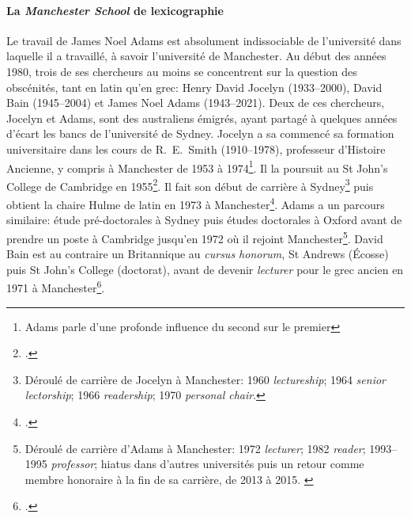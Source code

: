 \paragraph{La \textit{Manchester School} de lexicographie}

Le travail de James Noel Adams est absolument indissociable de l'université dans laquelle il a travaillé, à savoir l'université de Manchester. Au début des années 1980, trois de ses chercheurs au moins se concentrent sur la question des obscénités, tant en latin qu'en grec: Henry David Jocelyn (1933--2000), David Bain (1945--2004) et James Noel Adams (1943--2021). Deux de ces chercheurs, Jocelyn et Adams, sont des australiens émigrés, ayant partagé à quelques années d'écart les bancs de l'université de Sydney. Jocelyn a sa commencé sa formation universitaire dans les cours de R.~E.~Smith (1910--1978), professeur d'Histoire Ancienne, y compris à Manchester de 1953 à 1974\footnote{Adams parle d'une profonde influence du second sur le premier}. Il la poursuit au St John's College de Cambridge en 1955\footcite[p.~281--282]{adams_henry_2003}. Il fait son début de carrière à Sydney\footnote{Déroulé de carrière de Jocelyn à Manchester: 1960 \textit{lectureship}; 1964 \textit{senior lectorship}; 1966 \textit{readership}; 1970 \textit{personal chair}.} puis obtient la chaire Hulme de latin en 1973 à Manchester\footcite[p.~286]{adams_henry_2003}. Adams a un parcours similaire: étude pré-doctorales à Sydney puis études doctorales à Oxford avant de prendre un poste à Cambridge jusqu'en 1972 où il rejoint Manchester\footnote{Déroulé de carrière d'Adams à Manchester: 1972 \textit{lecturer}; 1982 \textit{reader}; 1993--1995 \textit{professor}; hiatus dans d'autres universités puis un retour comme membre honoraire à la fin de sa carrière, de 2013 à 2015. \textcite{adams_page_carreer}}. David Bain est au contraire un Britannique au \textit{cursus honorum}, St Andrews (Écosse) puis St John's College (doctorat), avant de devenir \textit{lecturer} pour le grec ancien en 1971 à Manchester\footcite{bain_obituary}. 


